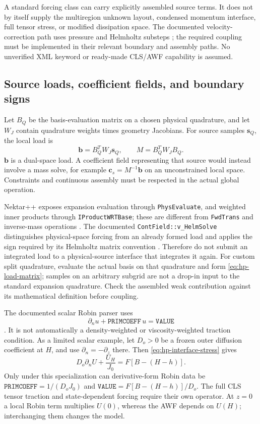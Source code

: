 \documentclass[11pt,a4paper]{article}
\numberwithin{equation}{section}
\begin{document}
A standard forcing class can carry explicitly assembled source terms.
It does not by itself supply the multiregion unknown layout, condensed
momentum interface, full tensor stress, or modified dissipation space.
The documented velocity-correction path uses pressure and Helmholtz
substeps \cite{NektarTheory,NektarVCS}; the required coupling must be
implemented in their relevant boundary and assembly paths. No
unverified XML keyword or ready-made CLS/AWF capability is assumed.

\subsection{Source loads, coefficient fields, and boundary signs}
Let $B_Q$ be the basis-evaluation matrix on a chosen physical quadrature,
and let $W_J$ contain quadrature weights times geometry Jacobians.
For source samples $\bm s_Q$, the local load is
\begin{equation}
 \bm b=B_Q^TW_J\bm s_Q,
 \qquad M=B_Q^TW_JB_Q.
 \label{eq:hp-load-matrix}
\end{equation}
$\bm b$ is a dual-space load. A coefficient field representing that
source would instead involve a mass solve, for example
$\bm c_s=M^{-1}\bm b$ on an unconstrained local space. Constraints and
continuous assembly must be respected in the actual global operation.

Nektar++ exposes expansion evaluation through \texttt{PhysEvaluate},
and weighted inner products through \texttt{IProductWRTBase}; these
are different from \texttt{FwdTrans} and inverse-mass operations
\cite{NektarExpList}. The documented \texttt{ContField::v\_HelmSolve}
distinguishes physical-space forcing from an already formed load and
applies the sign required by its Helmholtz matrix convention
\cite{NektarContField}. Therefore do not submit an integrated load to
a physical-source interface that integrates it again. For custom
split quadrature, evaluate the actual basis on that quadrature and form
\cref{eq:hp-load-matrix}; samples on an arbitrary subgrid are not a
drop-in input to the standard expansion quadrature. Check the assembled
weak contribution against its mathematical definition before coupling.

The documented scalar Robin parser uses
\begin{equation}
 \partial_n u+\texttt{PRIMCOEFF}\,u=\texttt{VALUE}
 \label{eq:nektar-robin-convention}
\end{equation}
\cite{NektarConditions}. It is not automatically a density-weighted
or viscosity-weighted traction condition. As a limited scalar example,
let $D_o>0$ be a frozen outer diffusion coefficient at $H$, and use
$\partial_n=-\partial_z$ there. Then \cref{eq:hp-interface-stress}
gives
\begin{equation}
 D_o\partial_n U+\frac{U_H}{J_0}
 =F[B-(H-h)].
 \label{eq:hp-robin-scalar}
\end{equation}
Only under this specialization can derivative-form Robin data be
$\texttt{PRIMCOEFF}=1/(D_oJ_0)$ and
$\texttt{VALUE}=F[B-(H-h)]/D_o$. The full CLS tensor traction and
state-dependent forcing require their own operator. At $z=0$ a local
Robin term multiplies $U(0)$, whereas the AWF depends on $U(H)$;
interchanging them changes the model.
\end{document}
